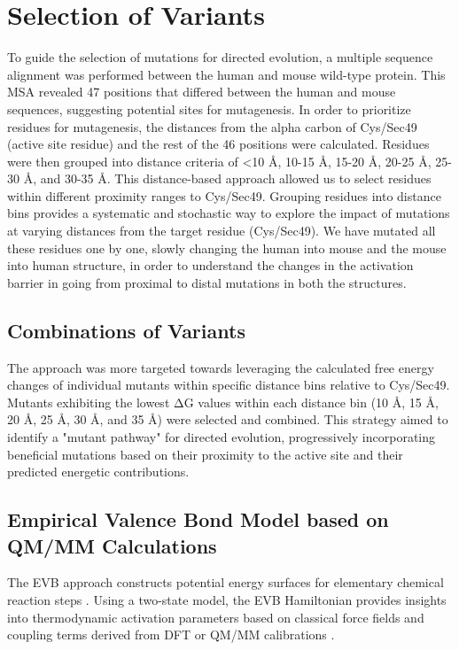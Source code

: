 \documentclass[journal=jacsat,manuscript=article]{achemso}
\begin{document}
\section{Selection of Variants}

To guide the selection of mutations for directed evolution, a multiple sequence alignment was performed between the human and mouse wild-type protein. This MSA revealed 47 positions that differed between the human and mouse sequences, suggesting potential sites for mutagenesis. In order to prioritize residues for mutagenesis, the distances from the alpha carbon of Cys/Sec49 (active site residue) and the rest of the 46 positions were calculated. Residues were then grouped into distance criteria of <10 Å, 10-15 Å, 15-20 Å, 20-25 Å, 25-30 Å, and 30-35 Å. This distance-based approach allowed us to select residues within different proximity ranges to Cys/Sec49. Grouping residues into distance bins provides a systematic and stochastic way to explore the impact of mutations at varying distances from the target residue (Cys/Sec49). We have mutated all these residues one by one, slowly changing the human into mouse and the mouse into human structure, in order to understand the changes in the activation barrier in going from proximal to distal mutations in both the structures.

\subsection{Combinations of Variants}

The approach was more targeted towards leveraging the calculated free energy changes of individual mutants within specific distance bins relative to Cys/Sec49. Mutants exhibiting the lowest ΔG values within each distance bin (10 Å, 15 Å, 20 Å, 25 Å, 30 Å, and 35 Å) were selected and combined. This strategy aimed to identify a "mutant pathway" for directed evolution, progressively incorporating beneficial mutations based on their proximity to the active site and their predicted energetic contributions.

\subsection{Empirical Valence Bond Model based on QM/MM Calculations}

The EVB approach constructs potential energy surfaces for elementary chemical reaction steps \cite{Oanca2024}. Using a two-state model, the EVB Hamiltonian provides insights into thermodynamic activation parameters based on classical force fields and coupling terms derived from DFT or QM/MM calibrations \cite{Oanca2023}.
\end{document}
